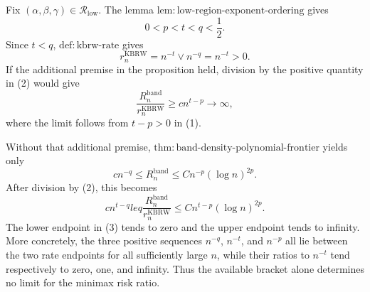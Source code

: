 Fix \((\alpha,\beta,\gamma)\in\mathcal R_{\mathrm{low}}\).  The lemma
\(\mathrm{lem:low\mbox{-}region\mbox{-}exponent\mbox{-}ordering}\) gives
\[
0<p<t<q<\frac12.
\tag{1}
\]
Since \(t<q\), \(\mathrm{def:kbrw\mbox{-}rate}\) gives
\[
r_n^{\mathrm{KBRW}}=n^{-t}\vee n^{-q}=n^{-t}>0.
\tag{2}
\]
If the additional premise in the proposition held, division by the positive
quantity in (2) would give
\[
\frac{R_n^{\mathrm{band}}}{r_n^{\mathrm{KBRW}}}
\geq c n^{t-p}\longrightarrow\infty,
\]
where the limit follows from \(t-p>0\) in (1).

Without that additional premise,
\(\mathrm{thm:band\mbox{-}density\mbox{-}polynomial\mbox{-}frontier}\) yields only
\[
c n^{-q}\leq R_n^{\mathrm{band}}
\leq Cn^{-p}(\log n)^{2p}.
\]
After division by (2), this becomes
\[
c n^{t-q}leq
\frac{R_n^{\mathrm{band}}}{r_n^{\mathrm{KBRW}}}
\leq Cn^{t-p}(\log n)^{2p}.
\tag{3}
\]
The lower endpoint in (3) tends to zero and the upper endpoint tends to infinity.
More concretely, the three positive sequences \(n^{-q}\), \(n^{-t}\), and
\(n^{-p}\) all lie between the two rate endpoints for all sufficiently large
\(n\), while their ratios to \(n^{-t}\) tend respectively to zero, one, and
infinity.  Thus the available bracket alone determines no limit for the minimax
risk ratio.